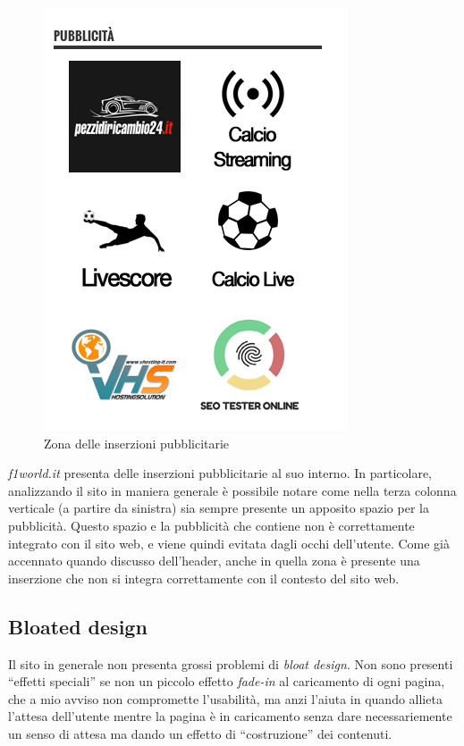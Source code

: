 \begin{figure}[H]
  \centering
  \includegraphics[scale=0.45]{ads}
  \caption{Zona delle inserzioni pubblicitarie}
\end{figure}
\textit{f1world.it} presenta delle inserzioni pubblicitarie al suo interno.
In particolare, analizzando il sito in maniera generale è possibile notare come
nella terza colonna verticale (a partire da sinistra) sia sempre presente un
apposito spazio per la pubblicità. Questo spazio e la pubblicità che contiene
non è correttamente integrato con il sito web, e viene quindi evitata dagli
occhi dell'utente.
Come già accennato quando discusso dell'header, anche in quella zona è presente
una inserzione che non si integra correttamente con il contesto del sito web.

\subsection{Bloated design}
Il sito in generale non presenta grossi problemi di \textit{bloat design}.
Non sono presenti ``effetti speciali'' se non un piccolo effetto
\textit{fade-in} al caricamento di ogni pagina, che a mio avviso non compromette
l'usabilità, ma anzi l'aiuta in quando allieta l'attesa dell'utente mentre la
pagina è in caricamento senza dare necessariemente un senso di attesa ma dando
un effetto di ``costruzione'' dei contenuti.
